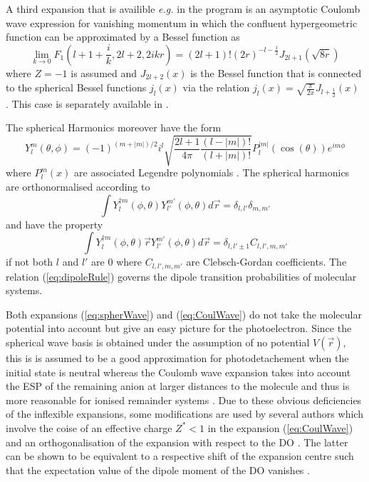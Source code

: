 A third expansion that is availible \textit{e.g.} in the program  \cite{ezDyson} is an asymptotic Coulomb wave expression for vanishing momentum in which the confluent hypergeometric function can be approximated by a Bessel function as
\begin{equation}
\lim_{k\rightarrow 0} F_1(l+1+\frac{i}{k}, 2l+2, 2ikr) =(2l+1)! (2r)^{-l-\frac 12} J_{2l+1}(\sqrt{8r})
\end{equation}
where $Z=-1$ is assumed and $J_{2l+2}(x)$ is the Bessel function that is connected to the spherical Bessel functions $j_l(x)$ via the relation $j_l(x)=\sqrt{\frac{\pi}{2x}} J_{l+\frac 12}(x)$ \cite{Lifschitz}.
This case is separately available in  \cite{ezDyson}.

The spherical Harmonics \cite{SphHarm} moreover have the form
\begin{equation}\label{eq:SphHarm}
Y_l^m(\theta,\phi)= (-1)^{(m+|m|)/2} i^l \sqrt{\frac{2l+1}{4\pi}\frac{(l-|m|)!}{(l+|m|)!}}  P_l^{|m|}(\cos(\theta)) e^{im\phi}
\end{equation}
where $P_l^m(x)$ are associated Legendre polynomials \cite{Lifschitz}.
The spherical harmonics are orthonormalised according to
\begin{equation}
\int Y_l^{\dagger m}(\phi,\theta)  Y_{l'}^{m'}(\phi,\theta) d\vec{r}=\delta_{l,l'} \delta_{m,m'}
\end{equation}
and have the property
\begin{equation} \label{eq:dipoleRule}
\int Y_l^{\dagger m}(\phi,\theta) \vec{r} Y_{l'}^{m'}(\phi,\theta) d\vec{r}=\delta_{l,l'\pm 1} C_{l,l', m,m'}
\end{equation}
if not both $l$ and $l'$ are $0$ where $C_{l,l',m,m'}$ are Clebsch-Gordan coefficients.
The relation  (\ref{eq:dipoleRule}) governs the dipole transition probabilities of molecular systems.

Both expansions (\ref{eq:spherWave}) and (\ref{eq:CoulWave}) do not take the molecular potential into account but give an easy picture for the photoelectron.
Since the spherical wave basis is obtained under the assumption of no potential $V(\vec{r})$, this is is assumed to be a good approximation for photodetachement when the initial state is neutral whereas the Coulomb wave expansion takes into account the ESP of the remaining anion at larger distances to the molecule and thus is more reasonable for ionised remainder systems \cite{do_modCoul}.
Due to these obvious deficiencies of the inflexible expansions, some modifications are used by several authors which involve the coise of an effective charge $Z^*<1$ in the expansion (\ref{eq:CoulWave}) \cite{do_modCoul} and an orthogonalisation of the expansion with respect to the DO \cite{do_modCoul,do_orthonorm,do_orthonorm1,do_pworth}.
The latter can be shown to be equivalent to a respective shift of the expansion centre such that the expectation value of the dipole moment of the DO vanishes \cite{do_orthonorm}.

